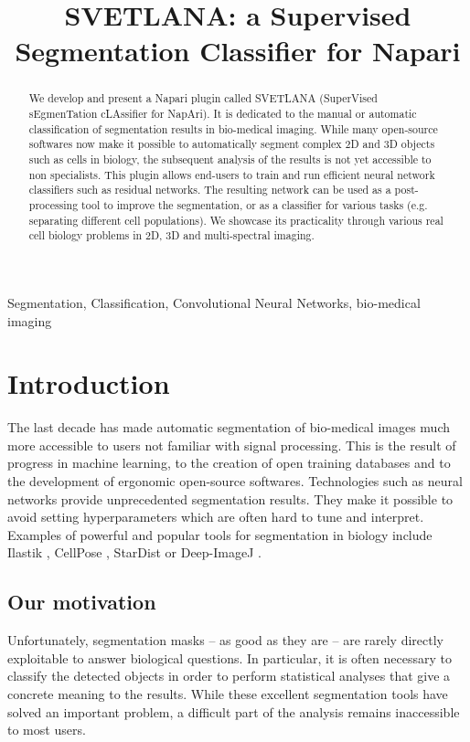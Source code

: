 \documentclass{article}
\title{SVETLANA: a Supervised Segmentation Classifier for Napari}
\begin{document}
%
\maketitle
%
\begin{abstract}
We develop and present a Napari plugin called SVETLANA (SuperVised sEgmenTation cLAssifier for NapAri). It is dedicated to the manual or automatic classification of segmentation results in bio-medical imaging.
While many open-source softwares now make it possible to automatically segment complex 2D and 3D objects such as cells in biology, the subsequent analysis of the results is not yet accessible to non specialists. 
This plugin allows end-users to train and run efficient neural network classifiers such as residual networks. 
The resulting network can be used as a post-processing tool to improve the segmentation, or as a classifier for various tasks (e.g. separating different cell populations).
We showcase its practicality through various real cell biology problems in 2D, 3D and multi-spectral imaging.
\end{abstract}
%
\begin{keywords}
Segmentation, Classification, Convolutional Neural Networks, bio-medical imaging
\end{keywords}
%
\section{Introduction}
\label{sec:intro}

The last decade has made automatic segmentation of bio-medical images much more accessible to users not familiar with signal processing. 
This is the result of progress in machine learning, to the creation of open training databases and to the development of ergonomic open-source softwares. Technologies such as neural networks provide unprecedented segmentation results. They make it possible to avoid setting hyperparameters which are often hard to tune and interpret. 
Examples of powerful and popular tools for segmentation in biology include Ilastik \cite{berg2019ilastik}, CellPose \cite{stringer2021cellpose}, StarDist \cite{fazeli2020automated} or Deep-ImageJ \cite{gomez2021deepimagej}. 

\subsection{Our motivation}

Unfortunately, segmentation masks -- as good as they are -- are rarely directly exploitable to answer biological questions. In particular, it is often necessary to classify the detected objects in order to perform statistical analyses that give a concrete meaning to the results. 
While these excellent segmentation tools have solved an important problem, a difficult part of the analysis remains inaccessible to most users.
\end{document}
